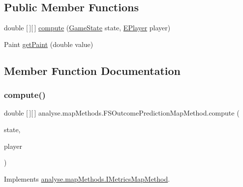 \subsection*{Public Member Functions}
\begin{DoxyCompactItemize}
\item 
double \mbox{[}$\,$\mbox{]}\mbox{[}$\,$\mbox{]} \mbox{\hyperlink{classanalyse_1_1map_methods_1_1_f_s_outcome_prediction_map_method_af2f0988760eea49a665a0eeb3db9b591}{compute}} (\mbox{\hyperlink{classgame_1_1game_state_1_1_game_state}{Game\+State}} state, \mbox{\hyperlink{enumgame_1_1_e_player}{E\+Player}} player)
\item 
Paint \mbox{\hyperlink{classanalyse_1_1map_methods_1_1_f_s_outcome_prediction_map_method_a6525a9b7d2475e2d46fb54924a5b5994}{get\+Paint}} (double value)
\end{DoxyCompactItemize}


\subsection{Member Function Documentation}
\mbox{\label{classanalyse_1_1map_methods_1_1_f_s_outcome_prediction_map_method_af2f0988760eea49a665a0eeb3db9b591}} 
\subsubsection{\texorpdfstring{compute()}{compute()}}
{\footnotesize\ttfamily double \mbox{[}$\,$\mbox{]}\mbox{[}$\,$\mbox{]} analyse.\+map\+Methods.\+F\+S\+Outcome\+Prediction\+Map\+Method.\+compute (\begin{DoxyParamCaption}\item[{\mbox{\hyperlink{classgame_1_1game_state_1_1_game_state}{Game\+State}}}]{state,  }\item[{\mbox{\hyperlink{enumgame_1_1_e_player}{E\+Player}}}]{player }\end{DoxyParamCaption})\hspace{0.3cm}{\ttfamily [inline]}}



Implements \mbox{\hyperlink{interfaceanalyse_1_1map_methods_1_1_i_metrics_map_method_aef15b826032a8cc1140563d539dd1319}{analyse.\+map\+Methods.\+I\+Metrics\+Map\+Method}}.

